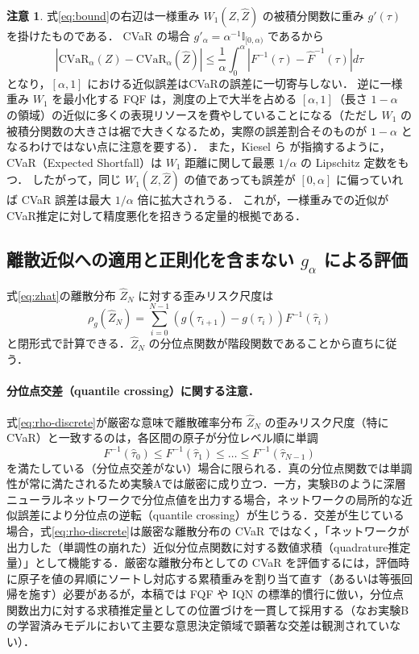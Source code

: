\documentclass[a4paper,10pt]{jsarticle}
\theoremstyle{definition}
\newtheorem{remark}{注意}[section]
\newcommand{\CVaR}{\mathrm{CVaR}}
\newcommand{\Wone}{W_1}
\newcommand{\Finv}{F^{-1}}
\newcommand{\Fhinv}{\hat{F}^{-1}}
\begin{document}
\begin{remark}
式\eqref{eq:bound}の右辺は一様重み $\Wone(Z,\hat Z)$ の被積分関数に重み $g'(\tau)$ を掛けたものである．
CVaR の場合 $g'_\alpha=\alpha^{-1}\mathbb{I}_{[0,\alpha)}$ であるから
\begin{equation}
  \left|\CVaR_\alpha(Z)-\CVaR_\alpha(\hat Z)\right|\le\frac1\alpha\int_0^\alpha\left|\Finv(\tau)-\Fhinv(\tau)\right|d\tau
  \label{eq:bound-cvar}
\end{equation}
となり，$[\alpha,1]$ における近似誤差はCVaRの誤差に一切寄与しない．
逆に一様重み $\Wone$ を最小化する FQF は，測度の上で大半を占める $[\alpha,1]$（長さ $1-\alpha$ の領域）の近似に多くの表現リソースを費やしていることになる（ただし $W_1$ の被積分関数の大きさは裾で大きくなるため，実際の誤差割合そのものが $1-\alpha$ となるわけではない点に注意を要する）．
また，Kiesel ら \cite{kiesel2016wasserstein} が指摘するように，CVaR（Expected Shortfall）は $W_1$ 距離に関して最悪 $1/\alpha$ の Lipschitz 定数をもつ．
したがって，同じ $\Wone(Z,\hat Z)$ の値であっても誤差が $[0,\alpha]$ に偏っていれば CVaR 誤差は最大 $1/\alpha$ 倍に拡大されうる．
これが，一様重みでの近似がCVaR推定に対して精度悪化を招きうる定量的根拠である．
\end{remark}
\subsection{離散近似への適用と正則化を含まない $g_\alpha$ による評価}
式\eqref{eq:zhat}の離散分布 $\hat Z_N$ に対する歪みリスク尺度は
\begin{equation}
  \rho_g(\hat Z_N)=\sum_{i=0}^{N-1}\left(g(\tau_{i+1})-g(\tau_i)\right)\Finv(\hat\tau_i)
  \label{eq:rho-discrete}
\end{equation}
と閉形式で計算できる．$\hat Z_N$ の分位点関数が階段関数であることから直ちに従う．

\paragraph{分位点交差（quantile crossing）に関する注意．}
式\eqref{eq:rho-discrete}が厳密な意味で離散確率分布 $\hat Z_N$ の歪みリスク尺度（特に CVaR）と一致するのは，各区間の原子が分位レベル順に単調
\begin{equation*}
  \Finv(\hat\tau_0)\le\Finv(\hat\tau_1)\le\dots\le\Finv(\hat\tau_{N-1})
\end{equation*}
を満たしている（分位点交差がない）場合に限られる．真の分位点関数では単調性が常に満たされるため実験Aでは厳密に成り立つ．一方，実験Bのように深層ニューラルネットワークで分位点値を出力する場合，ネットワークの局所的な近似誤差により分位点の逆転（quantile crossing）が生じうる．交差が生じている場合，式\eqref{eq:rho-discrete}は厳密な離散分布の CVaR ではなく，「ネットワークが出力した（単調性の崩れた）近似分位点関数に対する数値求積（quadrature推定量）」として機能する．厳密な離散分布としての CVaR を評価するには，評価時に原子を値の昇順にソートし対応する累積重みを割り当て直す（あるいは等張回帰を施す）必要があるが，本稿では FQF や IQN の標準的慣行に倣い，分位点関数出力に対する求積推定量としての位置づけを一貫して採用する（なお実験Bの学習済みモデルにおいて主要な意思決定領域で顕著な交差は観測されていない）．
\end{document}
